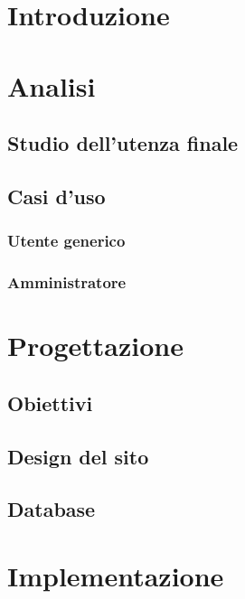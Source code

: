 \documentclass[a4paper, oneside, openany, dvipsnames, table]{article}
\begin{document}
\copertina
\tableofcontents
\newpage
\section{Introduzione}
	
\newpage
\section{Analisi}
	
	\subsection{Studio dell'utenza finale}
		
	\subsection{Casi d'uso}
		
		\subsubsection{Utente generico}
			
		\subsubsection{Amministratore}
			
\newpage
\section{Progettazione}
	
	\subsection{Obiettivi}
		
	\subsection{Design del sito}
		
	\subsection{Database}
		
\newpage
\section{Implementazione}
	
\end{document}
